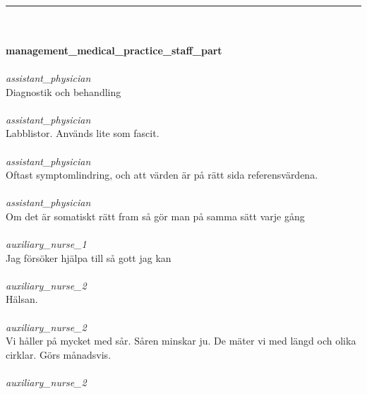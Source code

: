 \documentclass[12pt,a4paper,oneside]{article}
\begin{document}
\ \vspace{.66em}\\
\hrule
\ \vspace{.33em}\\
\ \\{\bf management\_medical\_practice\_staff\_part }
\\\ \\%
 { \it assistant\_physician %
}\\
Diagnostik och behandling %
\ \\\ \\
 { \it   assistant\_physician %
}\\
Labblistor. Anv{\"a}nds lite som fascit. %
\ \\\ \\
 { \it   assistant\_physician %
}\\
Oftast symptomlindring, och att v{\"a}rden {\"a}r p{\aa} r{\"a}tt sida referensv{\"a}rdena.  %
\ \\\ \\
 { \it   assistant\_physician %
}\\
Om det {\"a}r somatiskt r{\"a}tt fram s{\aa} g{\"o}r man p{\aa} samma s{\"a}tt varje g{\aa}ng %
\ \\\ \\
 { \it   auxiliary\_nurse\_1 %
}\\
Jag f{\"o}rs{\"o}ker hj{\"a}lpa till s{\aa} gott jag kan %
\ \\\ \\
 { \it   auxiliary\_nurse\_2 %
}\\
H{\"a}lsan.  %
\ \\\ \\
 { \it   auxiliary\_nurse\_2 %
}\\
Vi h{\aa}ller p{\aa} mycket med s{\aa}r. S{\aa}ren minskar ju. De m{\"a}ter vi med l{\"a}ngd och olika cirklar. G{\"o}rs m{\aa}nadsvis. %
\ \\\ \\
 { \it   auxiliary\_nurse\_2 %
}\\
\end{document}
